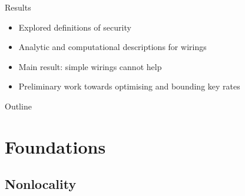 \documentclass[xcolor=dvipsnames]{beamer}
\newcommand{\?}{\mathrel{?}} %
\begin{document}
\begin{frame}{Results}
  \begin{itemize}[<+->]
    \item Explored \alert{definitions of security}
    \item Analytic and computational \alert{descriptions for wirings}
    \item Main result: simple wirings \alert{cannot help}
    \item Preliminary work towards \alert{optimising and bounding key rates}
  \end{itemize}
\end{frame}

\begin{frame}{Outline}
  \tableofcontents
\end{frame}

\section{Foundations}

\subsection{Nonlocality}
\end{document}
